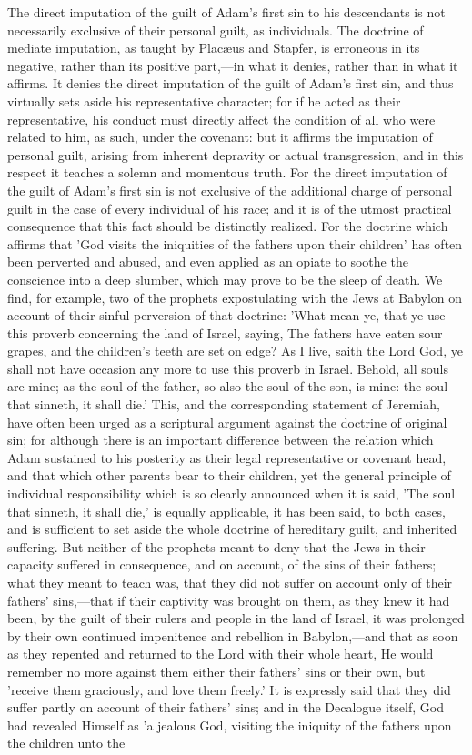 \documentclass[
]{book}
\begin{document}
The direct imputation of the guilt of Adam's first sin to his descendants is not necessarily exclusive of their personal guilt, as individuals. The doctrine of mediate imputation, as taught by Placæus and Stapfer, is erroneous in its negative, rather than its positive part,---in what it denies, rather than in what it affirms. It denies the direct imputation of the guilt of Adam's first sin, and thus virtually sets aside his representative character; for if he acted as their representative, his conduct must directly affect the condition of all who were related to him, as such, under the covenant: but it affirms the imputation of personal guilt, arising from inherent depravity or actual transgression, and in this respect it teaches a solemn and momentous truth. For the direct imputation of the guilt of Adam's first sin is not exclusive of the additional charge of personal guilt in the case of every individual of his race; and it is of the utmost practical consequence that this fact should be distinctly realized. For the doctrine which affirms that 'God visits the iniquities of the fathers upon their children' has often been perverted and abused, and even applied as an opiate to soothe the conscience into a deep slumber, which may prove to be the sleep of death. We find, for example, two of the prophets expostulating with the Jews at Babylon on account of their sinful perversion of that doctrine: 'What mean ye, that ye use this proverb concerning the land of Israel, saying, The fathers have eaten sour grapes, and the children's teeth are set on edge? As I live, saith the Lord God, ye shall not have occasion any more to use this proverb in Israel. Behold, all souls are mine; as the soul of the father, so also the soul of the son, is mine: the soul that sinneth, it shall die.' This, and the corresponding statement of Jeremiah, have often been urged as a scriptural argument against the doctrine of original sin; for although there is an important difference between the relation which Adam sustained to his posterity as their legal representative or covenant head, and that which other parents bear to their children, yet the general principle of individual responsibility which is so clearly announced when it is said, 'The soul that sinneth, it shall die,' is equally applicable, it has been said, to both cases, and is sufficient to set aside the whole doctrine of hereditary guilt, and inherited suffering. But neither of the prophets meant to deny that the Jews in their capacity suffered in consequence, and on account, of the sins of their fathers; what they meant to teach was, that they did not suffer on account only of their fathers' sins,---that if their captivity was brought on them, as they knew it had been, by the guilt of their rulers and people in the land of Israel, it was prolonged by their own continued impenitence and rebellion in Babylon,---and that as soon as they repented and returned to the Lord with their whole heart, He would remember no more against them either their fathers' sins or their own, but 'receive them graciously, and love them freely.' It is expressly said that they did suffer partly on account of their fathers' sins; and in the Decalogue itself, God had revealed Himself as 'a jealous God, visiting the iniquity of the fathers upon the children unto the 
\end{document}

